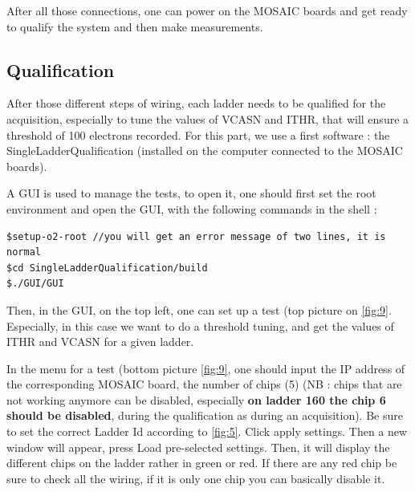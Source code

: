 \documentclass[12pt,oneside,a4]{article}
\begin{document}
After all those connections, one can power on the MOSAIC boards and get ready to qualify the system and then make measurements.

\subsection{Qualification}\label{Qualification}
After those different steps of wiring,  each ladder needs to be qualified for the acquisition, especially to tune the values of VCASN and ITHR, that will ensure a threshold of 100 electrons recorded. For this part, we use a first software : the SingleLadderQualification \cite{SingleLadderQualification} (installed on the computer connected to the MOSAIC boards).

A GUI is used to manage the tests, to open it, one should first set the root environment and open the GUI, with the following commands in the shell :

\begin{verbatim}
$setup-o2-root //you will get an error message of two lines, it is normal
$cd SingleLadderQualification/build
$./GUI/GUI
\end{verbatim}


Then, in the GUI, on the top left, one can set up a test (top picture on \ref{fig:9}. Especially, in this case we want to do a threshold tuning, and get the values of ITHR and VCASN for a given ladder.

In the menu for a test (bottom picture \ref{fig:9}, one should input the IP address of the corresponding MOSAIC board,  the number of chips (5) (NB : chips that are not working anymore can be disabled, especially \textbf{on ladder 160 the chip 6 should be disabled}, during the qualification as during an acquisition). Be sure to set the correct Ladder Id according to \ref{fig:5}. Click apply settings. Then a new window will appear, press Load pre-selected settings. 
Then, it will display the different chips on the ladder rather in green or red. If there are any red chip be sure to check all the wiring, if it is only one chip you can basically disable it. 
\end{document}
